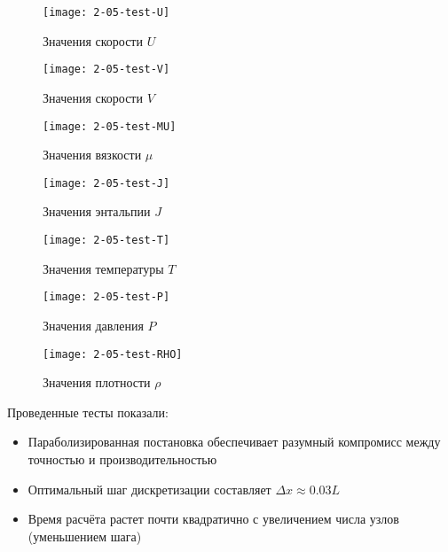 \begin{figure}
    \texttt{[image: 2-05-test-U]}
    \caption{Значения скорости $U$}
    \label{fig:acc_U}
\end{figure}

\begin{figure}
    \texttt{[image: 2-05-test-V]}
    \caption{Значения скорости $V$}
    \label{fig:acc_V}
\end{figure}

\begin{figure}
    \texttt{[image: 2-05-test-MU]}
    \caption{Значения вязкости $\mu$}
    \label{fig:acc_MU}
\end{figure}

\begin{figure}
    \texttt{[image: 2-05-test-J]}
    \caption{Значения энтальпии $J$}
    \label{fig:acc_J}
\end{figure}

\begin{figure}
    \texttt{[image: 2-05-test-T]}
    \caption{Значения температуры $T$}
    \label{fig:acc_T}
\end{figure}

\begin{figure}
    \texttt{[image: 2-05-test-P]}
    \caption{Значения давления $P$}
    \label{fig:acc_P}
\end{figure}

\begin{figure}
    \texttt{[image: 2-05-test-RHO]}
    \caption{Значения плотности $\rho$}
    \label{fig:acc_RHO}
\end{figure}

Проведенные тесты показали:
\begin{itemize}
\item Параболизированная постановка обеспечивает разумный компромисс между точностью и производительностью
\item Оптимальный шаг дискретизации составляет $\Delta x \approx 0.03L$
\item Время расчёта растет почти квадратично с увеличением числа узлов (уменьшением шага)
\end{itemize}